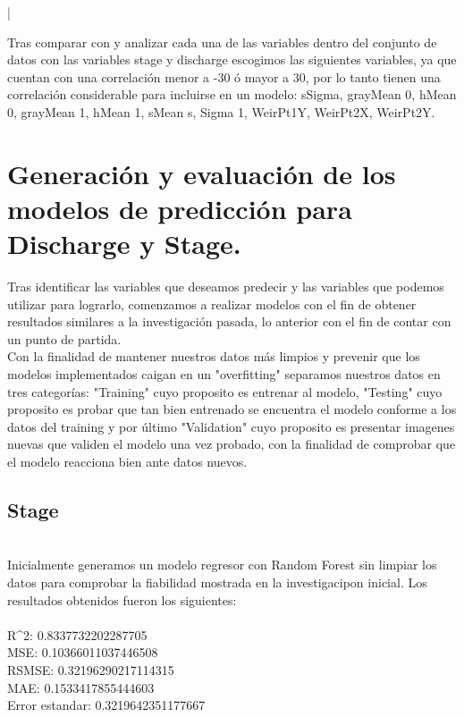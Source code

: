 |\documentclass{article}
\begin{document}
        Tras comparar con y analizar cada una de las variables dentro del conjunto de datos con las variables stage y discharge escogimos las siguientes variables, ya que cuentan con una correlación menor a -30 ó mayor a 30, por lo tanto tienen una correlación considerable para incluirse en un modelo: sSigma, grayMean 0, hMean 0, grayMean 1, hMean 1, sMean s, Sigma 1, WeirPt1Y, WeirPt2X, WeirPt2Y. 




    \section{Generación y evaluación de los modelos de predicción para Discharge y Stage.}
    Tras identificar las variables que deseamos predecir y las variables que podemos utilizar para lograrlo, comenzamos a realizar modelos con el fin de obtener resultados similares a la investigación pasada, lo anterior con el fin de contar con un punto de partida. \\

    Con la finalidad de mantener nuestros datos más limpios y prevenir que los modelos implementados caigan en un "overfitting" separamos nuestros datos en tres categorías: "Training" cuyo proposito es entrenar al modelo, "Testing" cuyo proposito es probar que tan bien entrenado se encuentra el modelo conforme a los datos del training y por último "Validation" cuyo proposito es presentar imagenes nuevas que validen el modelo una vez probado, con la finalidad de comprobar que el modelo reacciona bien ante datos nuevos. 

    

    \subsection{Stage}\\

    Inicialmente generamos un modelo regresor con Random Forest sin limpiar los datos para comprobar la fiabilidad mostrada en la investigacipon inicial. Los resultados obtenidos fueron los siguientes:\\
    \\
    {R^{2}}:  0.8337732202287705 \\
    MSE:  0.10366011037446508 \\
    RSMSE:  0.32196290217114315\\
    MAE:  0.1533417855444603\\
    Error estandar:  0.3219642351177667\\
\end{document}
